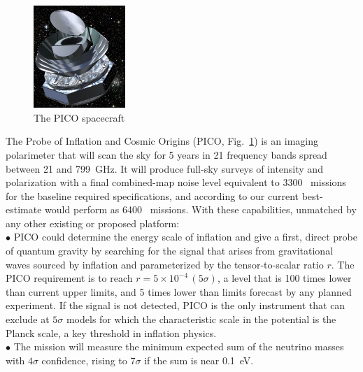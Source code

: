 \documentclass[PICOAPC.tex]{subfiles}
\begin{document}
\begin{figure}  %
\vspace{-5pt} %
\includegraphics[width=0.31\textwidth]{images/PICO_Image.jpg}
\vspace{-0.25in}
\caption{\captiontext The PICO spacecraft 
\label{fig:pico_rendered} }
\end{figure}
The Probe of Inflation and Cosmic Origins (PICO, Fig.~\ref{fig:pico_rendered}) is an imaging polarimeter that will scan the sky for 5 years in 21 frequency bands spread between 21 and 799~GHz.
It will produce full-sky surveys of intensity and polarization with a final combined-map noise level equivalent to 3300 \planck\ missions for the baseline required specifications, and according to our current best-estimate 
would perform as 6400 \planck\ missions. With these capabilities, unmatched by any other existing or proposed platform: \\
$\bullet$ PICO could determine the energy scale of inflation and give a first, direct probe of quantum gravity by searching for the signal that arises from gravitational waves sourced by inflation and parameterized by the tensor-to-scalar ratio $r$. The PICO requirement is to reach $r =5\times10^{-4} \, (5\sigma)$, a level that is 100 times lower than current upper limits, and 5 times lower than limits forecast by any planned experiment.  If the signal is not detected, PICO is the only instrument that can exclude at $5 \sigma$ models for which the characteristic scale in the potential is the Planck scale, a key threshold in inflation physics. \\ %
$\bullet$ The mission will measure the minimum expected sum of the neutrino masses with $4\sigma$ confidence, rising to $7\sigma$ if the sum is near 0.1~eV. 
\end{document}
